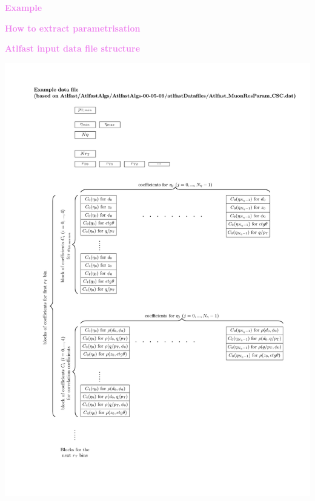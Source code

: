 \documentclass[8pt]{beamer}
\begin{document}
\begin{frame}
  \begin{center}
    {\textcolor{violet}{\LARGE{\bf Example}}}
  \end{center}
\end{frame}



\begin{frame}
  \begin{center}
    {\textcolor{violet}{\LARGE{\bf How to extract parametrisation}}}
  \end{center}
\end{frame}




\begin{frame}
  \begin{center}
    {\textcolor{violet}{\LARGE{\bf Atlfast input data file structure}}}
  \end{center}
\end{frame}

\begin{frame}
\begin{center}
\vskip-10pt
  \includegraphics[height=1.1\textheight]{DataFile}
\end{center}
\end{frame}
\end{document}
